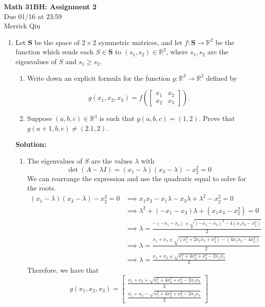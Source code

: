 \documentclass{report}
\newcommand{\solution}{\textbf{Solution: }}
\begin{document}
\begin{center}
	\huge{\bf Math 31BH: Assignment 2} \\
	Due 01/16 at 23:59 \\
	Merrick Qiu
\end{center}

\bigskip

\begin{enumerate}

	\item
	Let $\mathbf{S}$ be the space of $2 \times 2$ symmetric matrices, and let 
	$f \colon \mathbf{S} \to \mathbb{R}^2$ be the function which sends each 
	$S \in \mathbf{S}$ to $(s_1,s_2) \in \mathbb{R}^2$, where $s_1,s_2$ are 
	the eigenvalues of $S$ and $s_1 \geq s_2$. 
	\begin{enumerate}
		
		\smallskip
		\item
		Write down an explicit formula for the function $g \colon \mathbb{R}^3 \to \mathbb{R}^2$ defined by 
	
			\begin{equation*}
				g(x_1,x_2,x_3) = f\left( \begin{bmatrix} x_1 & x_2 \\ x_2 & x_3 \end{bmatrix} \right).
			\end{equation*}
			
		\smallskip
		\item
		Suppose $(a,b,c) \in \mathbb{R}^3$ is such that $g(a,b,c) = (1,2)$. Prove that
		$g(a+1,b,c) \neq (2.1,2)$.
	\end{enumerate}
	
	\solution 
	\begin{enumerate}
		\item    
		The eigenvalues of $S$ are the values $\lambda$ with 
		\[
			\det (A-\lambda I) = (x_1-\lambda)(x_3-\lambda)-x_2^2 = 0
		\]
		We can rearrange the expression and use the quadratic equal to solve for the roots.
		\begin{align*}
			(x_1-\lambda)(x_3-\lambda)-x_2^2 = 0
			&\implies x_1x_3 - x_1\lambda - x_3\lambda + \lambda^2 - x_2^2 = 0 \\
			&\implies \lambda^2 + (-x_1-x_3)\lambda + (x_1x_3-x_2^2) = 0 \\
			&\implies \lambda = \frac{-(-x_1-x_3) \pm \sqrt{(-x_1-x_3)^2-4(x_1x_3-x_2^2)}}{2} \\
			&\implies \lambda = \frac{x_1+x_3 \pm \sqrt{(x_1^2+2x_1x_3+x_3^2)-(4x_1x_3-4x_2^2)}}{2} \\
			&\implies \lambda = \frac{x_1+x_3 \pm \sqrt{x_1^2 + 4x_2^2 + x_3^2 - 2x_1x_3}}{2}
		\end{align*}
		Therefore, we have that 
		\[
			g(x_1, x_2, x_3) = 
			\begin{bmatrix}
				\frac{x_1+x_3 + \sqrt{x_1^2 + 4x_2^2 + x_3^2 - 2x_1x_3}}{2} \\
				\frac{x_1+x_3 - \sqrt{x_1^2 + 4x_2^2 + x_3^2 - 2x_1x_3}}{2}
			\end{bmatrix}
		\]
		

\end{enumerate}
\end{enumerate}
\end{document}
